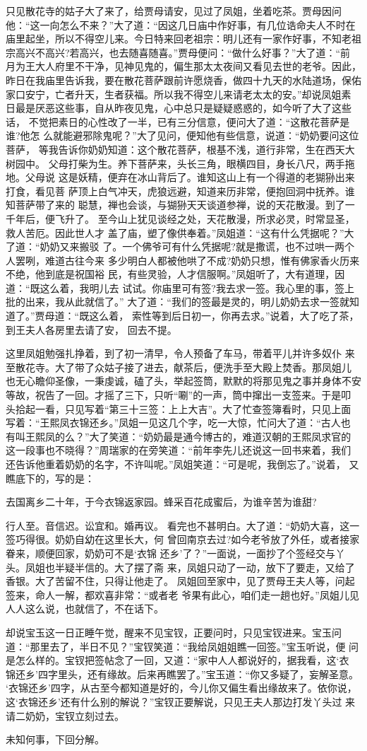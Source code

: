 只见散花寺的姑子大了来了，给贾母请安，见过了凤姐，坐着吃茶。贾母因问
他：“这一向怎么不来？”大了道：“因这几日庙中作好事，有几位诰命夫人不时在
庙里起坐，所以不得空儿来。今日特来回老祖宗：明儿还有一家作好事，不知老祖
宗高兴不高兴?若高兴，也去随喜随喜。”贾母便问：“做什么好事？”大了道：“前
月为王大人府里不干净，见神见鬼的，偏生那太太夜间又看见去世的老爷。因此，
昨日在我庙里告诉我，要在散花菩萨跟前许愿烧香，做四十九天的水陆道场，保佑
家口安宁，亡者升天，生者获福。所以我不得空儿来请老太太的安。”却说凤姐素
日最是厌恶这些事，自从昨夜见鬼，心中总只是疑疑惑惑的，如今听了大了这些话，
不觉把素日的心性改了一半，已有三分信意，便问大了道：“这散花菩萨是谁?他怎
么就能避邪除鬼呢？”大了见问，便知他有些信意，说道：“奶奶要问这位菩萨，
等我告诉你奶奶知道：这个散花菩萨，根基不浅，道行非常，生在西天大树园中。
父母打柴为生。养下菩萨来，头长三角，眼横四目，身长八尺，两手拖地。父母说
这是妖精，便弃在冰山背后了。谁知这山上有一个得道的老猢狲出来打食，看见菩
萨顶上白气冲天，虎狼远避，知道来历非常，便抱回洞中抚养。谁知菩萨带了来的
聪慧，禅也会谈，与猢狲天天谈道参禅，说的天花散漫。到了一千年后，便飞升了。
至今山上犹见谈经之处，天花散漫，所求必灵，时常显圣，救人苦厄。因此世人才
盖了庙，塑了像供奉着。”凤姐道：“这有什么凭据呢？”大了道：“奶奶又来搬驳
了。一个佛爷可有什么凭据呢?就是撒谎，也不过哄一两个人罢咧，难道古往今来
多少明白人都被他哄了不成?奶奶只想，惟有佛家香火历来不绝，他到底是祝国裕
民，有些灵验，人才信服啊。”凤姐听了，大有道理，因道：“既这么着，我明儿去
试试。你庙里可有签?我去求一签。我心里的事，签上批的出来，我从此就信了。”
大了道：“我们的签最是灵的，明儿奶奶去求一签就知道了。”贾母道：“既这么着，
索性等到后日初一，你再去求。”说着，大了吃了茶，到王夫人各房里去请了安，
回去不提。

这里凤姐勉强扎挣着，到了初一清早，令人预备了车马，带着平儿并许多奴仆
来至散花寺。大了带了众姑子接了进去，献茶后，便洗手至大殿上焚香。那凤姐儿
也无心瞻仰圣像，一秉虔诚，磕了头，举起签筒，默默的将那见鬼之事并身体不安
等故，祝告了一回。才摇了三下，只听“唰”的一声，筒中撺出一支签来。于是叩
头拾起一看，只见写着“第三十三签：上上大吉”。大了忙查签簿看时，只见上面
写着：“王熙凤衣锦还乡。”凤姐一见这几个字，吃一大惊，忙问大了道：“古人也
有叫王熙凤的么？”大了笑道：“奶奶最是通今博古的，难道汉朝的王熙凤求官的
这一段事也不晓得？”周瑞家的在旁笑道：“前年李先儿还说这一回书来着，我们
还告诉他重着奶奶的名字，不许叫呢。”凤姐笑道：“可是呢，我倒忘了。”说着，
又瞧底下的，写的是：

去国离乡二十年，于今衣锦返家园。蜂采百花成蜜后，为谁辛苦为谁甜?

行人至。音信迟。讼宜和。婚再议。
看完也不甚明白。大了道：“奶奶大喜，这一签巧得很。奶奶自幼在这里长大，何
曾回南京去过?如今老爷放了外任，或者接家眷来，顺便回家，奶奶可不是‘衣锦
还乡’了？”一面说，一面抄了个签经交与丫头。凤姐也半疑半信的。大了摆了斋
来，凤姐只动了一动，放下了要走，又给了香银。大了苦留不住，只得让他走了。
凤姐回至家中，见了贾母王夫人等，问起签来，命人一解，都欢喜非常：“或者老
爷果有此心，咱们走一趟也好。”凤姐儿见人人这么说，也就信了，不在话下。

却说宝玉这一日正睡午觉，醒来不见宝钗，正要问时，只见宝钗进来。宝玉问
道：“那里去了，半日不见？”宝钗笑道：“我给凤姐姐瞧一回签。”宝玉听说，便
问是怎么样的。宝钗把签帖念了一回，又道：“家中人人都说好的，据我看，这‘衣
锦还乡’四字里头，还有缘故。后来再瞧罢了。”宝玉道：“你又多疑了，妄解圣意。
‘衣锦还乡’四字，从古至今都知道是好的，今儿你又偏生看出缘故来了。依你说，
这‘衣锦还乡’还有什么别的解说？”宝钗正要解说，只见王夫人那边打发丫头过
来请二奶奶，宝钗立刻过去。

未知何事，下回分解。